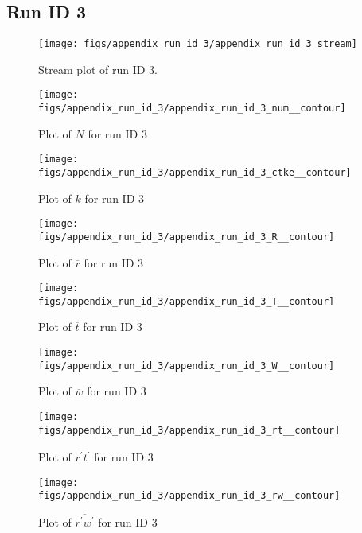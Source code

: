 \subsection{Run ID 3}
\begin{figure}[H]
\centering
\texttt{[image: figs/appendix\_run\_id\_3/appendix\_run\_id\_3\_stream]}
\caption{Stream plot of run ID 3.}
\label{fig:appendix_run_id_3_stream}
\end{figure}


\begin{figure}[H]
\centering
\texttt{[image: figs/appendix\_run\_id\_3/appendix\_run\_id\_3\_num\_\_contour]}
\caption{Plot of $N$ for run ID 3}
\label{fig:appendix_run_id_3_num__contour}
\end{figure}


\begin{figure}[H]
\centering
\texttt{[image: figs/appendix\_run\_id\_3/appendix\_run\_id\_3\_ctke\_\_contour]}
\caption{Plot of $k$ for run ID 3}
\label{fig:appendix_run_id_3_ctke__contour}
\end{figure}


\begin{figure}[H]
\centering
\texttt{[image: figs/appendix\_run\_id\_3/appendix\_run\_id\_3\_R\_\_contour]}
\caption{Plot of $\overline{r}$ for run ID 3}
\label{fig:appendix_run_id_3_R__contour}
\end{figure}


\begin{figure}[H]
\centering
\texttt{[image: figs/appendix\_run\_id\_3/appendix\_run\_id\_3\_T\_\_contour]}
\caption{Plot of $\overline{t}$ for run ID 3}
\label{fig:appendix_run_id_3_T__contour}
\end{figure}


\begin{figure}[H]
\centering
\texttt{[image: figs/appendix\_run\_id\_3/appendix\_run\_id\_3\_W\_\_contour]}
\caption{Plot of $\overline{w}$ for run ID 3}
\label{fig:appendix_run_id_3_W__contour}
\end{figure}


\begin{figure}[H]
\centering
\texttt{[image: figs/appendix\_run\_id\_3/appendix\_run\_id\_3\_rt\_\_contour]}
\caption{Plot of $\overline{r^\prime t^\prime}$ for run ID 3}
\label{fig:appendix_run_id_3_rt__contour}
\end{figure}


\begin{figure}[H]
\centering
\texttt{[image: figs/appendix\_run\_id\_3/appendix\_run\_id\_3\_rw\_\_contour]}
\caption{Plot of $\overline{r^\prime w^\prime}$ for run ID 3}
\label{fig:appendix_run_id_3_rw__contour}
\end{figure}


